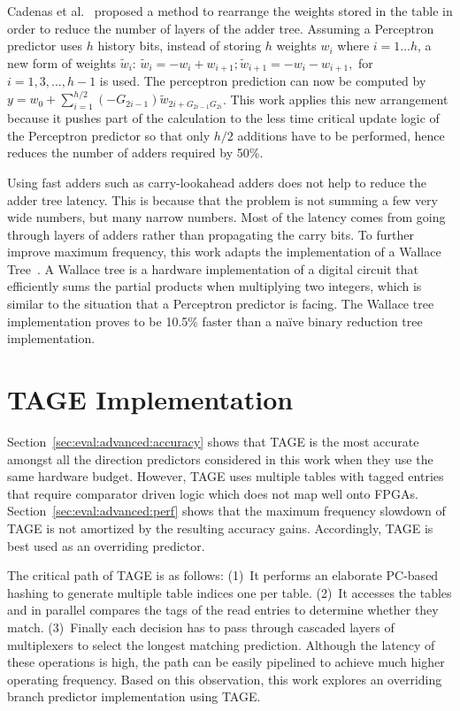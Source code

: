 Cadenas et al.~\cite{perceptronRearrange} proposed a method to rearrange the weights stored in the table in order to reduce the number of layers of the adder tree. Assuming a Perceptron predictor uses $h$ history bits, instead of storing $h$ weights $w_i$ where $i = 1 ... h$, a new form of weights $\widetilde{w}_i$: $\widetilde{w}_i = - w_i + w_{i+1}; \widetilde{w}_{i+1} = - w_i - w_{i+1},$ for $i = 1, 3, ..., h-1$ is used. The perceptron prediction can now be computed by $y = w_0 + \sum_{i=1}^{h/2}(-G_{2i-1})\widetilde{w}_{2i+G_{2i-1}G_{2i}}$. This work applies this new arrangement because it pushes part of the calculation to the less time critical update logic of the Perceptron predictor so that only $h/2$ additions have to be performed, hence reduces the number of adders required by 50\%.

Using fast adders such as carry-lookahead adders does not help to reduce the adder tree latency. This is because that the problem is not summing a few very wide numbers, but many narrow numbers. Most of the latency comes from going through layers of adders rather than propagating the carry bits. To further improve maximum frequency, this work adapts the implementation of a Wallace Tree~\cite{wallacetree}. A Wallace tree is a hardware implementation of a digital circuit that efficiently sums the partial products when multiplying two integers, which is similar to the situation that a Perceptron predictor is facing. The Wallace tree implementation proves to be 10.5\% faster than a na\"ive binary reduction tree implementation. 


\section{TAGE Implementation}
\label{sec:advanced:tage}
Section~\ref{sec:eval:advanced:accuracy} shows that TAGE is the most accurate amongst all the direction predictors considered in this work when they use the same hardware budget. However, TAGE uses multiple tables with tagged entries that require comparator driven logic which does not map well onto FPGAs. Section~\ref{sec:eval:advanced:perf} shows that the maximum frequency slowdown of TAGE is not amortized by the resulting accuracy gains. Accordingly, TAGE is best used as an overriding predictor.

The critical path of TAGE is as follows: (1)~It performs an elaborate PC-based hashing to generate multiple table indices one per table. (2)~It accesses the tables and in parallel compares the tags of the read entries to determine whether they match. (3)~Finally each decision has to pass through cascaded layers of multiplexers to select the longest matching prediction. Although the latency of these operations is high, the path can be easily pipelined to achieve much higher operating frequency. Based on this observation, this work explores an overriding branch predictor implementation using TAGE.

